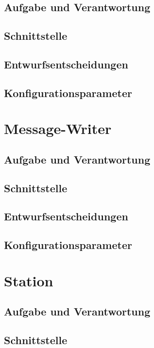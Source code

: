 \documentclass[draft=false
              ,paper=a4
              ,twoside=false
              ,fontsize=11pt
              ,headsepline
              ,BCOR10mm
              ,DIV11
              ]{scrbook}
\begin{document}
\subsection{Aufgabe und Verantwortung}

\subsection{Schnittstelle}

\subsection{Entwurfsentscheidungen}

\subsection{Konfigurationsparameter}

\section{Message-Writer}

\subsection{Aufgabe und Verantwortung}

\subsection{Schnittstelle}

\subsection{Entwurfsentscheidungen}

\subsection{Konfigurationsparameter}

\section{Station}

\subsection{Aufgabe und Verantwortung}

\subsection{Schnittstelle}
\end{document}
